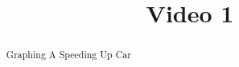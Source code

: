 \documentclass[handout]{ximera}
\title{Video 1}
\begin{document}
\begin{abstract}
Graphing A Speeding Up Car
\end{abstract}

\maketitle

\end{document}
